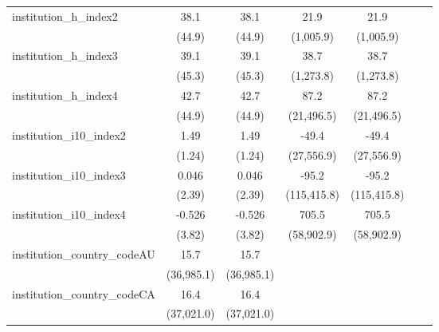 \begin{tabular}{lcccccc}
   institution\_h\_index2                & 38.1         & 38.1         & 21.9         & 21.9         &            &   \\   
                                         & (44.9)       & (44.9)       & (1,005.9)    & (1,005.9)    &            &   \\   
   institution\_h\_index3                & 39.1         & 39.1         & 38.7         & 38.7         &            &   \\   
                                         & (45.3)       & (45.3)       & (1,273.8)    & (1,273.8)    &            &   \\   
   institution\_h\_index4                & 42.7         & 42.7         & 87.2         & 87.2         &            &   \\   
                                         & (44.9)       & (44.9)       & (21,496.5)   & (21,496.5)   &            &   \\   
   institution\_i10\_index2              & 1.49         & 1.49         & -49.4        & -49.4        &            &   \\   
                                         & (1.24)       & (1.24)       & (27,556.9)   & (27,556.9)   &            &   \\   
   institution\_i10\_index3              & 0.046        & 0.046        & -95.2        & -95.2        &            &   \\   
                                         & (2.39)       & (2.39)       & (115,415.8)  & (115,415.8)  &            &   \\   
   institution\_i10\_index4              & -0.526       & -0.526       & 705.5        & 705.5        &            &   \\   
                                         & (3.82)       & (3.82)       & (58,902.9)   & (58,902.9)   &            &   \\   
   institution\_country\_codeAU          & 15.7         & 15.7         &              &              &            &   \\   
                                         & (36,985.1)   & (36,985.1)   &              &              &            &   \\   
   institution\_country\_codeCA          & 16.4         & 16.4         &              &              &            &   \\   
                                         & (37,021.0)   & (37,021.0)   &              &              &            &   \\   

\end{tabular}
